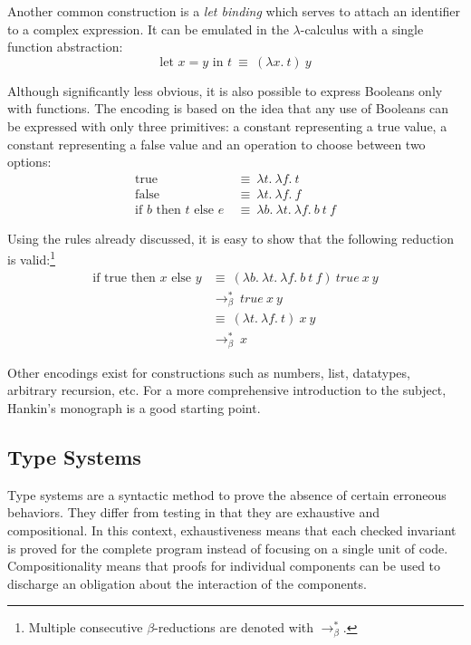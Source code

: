 Another common construction is a \emph{let binding} which serves to attach an identifier to a
complex expression. It can be emulated in the $\lambda$-calculus with a single function abstraction:
\begin{displaymath}
  \text{let } x = y \text{ in } t \: \equiv \: (\lambda x. \ t) \ y
\end{displaymath}

Although significantly less obvious, it is also possible to express Booleans only with functions.
The encoding is based on the idea that any use of Booleans can be expressed with only three
primitives: a constant representing a true value, a constant representing a false value and an
operation to choose between two options:
\begin{align*}
  \text{true}
    & \: \equiv \: \lambda t. \ \lambda f. \ t \\
  \text{false}
    & \: \equiv \: \lambda t. \ \lambda f. \ f \\
  \text{if } b \text{ then } t \text{ else } e
    & \: \equiv \: \lambda b. \ \lambda t. \ \lambda f. \ b \ t \ f
\end{align*}

Using the rules already discussed, it is easy to show that the following reduction is
valid:\footnote{Multiple consecutive $\beta$-reductions are denoted with $\to_\beta^*$.}
\begin{align*}
  \text{if true then } x \text{ else } y
    & \equiv \: (\lambda b. \ \lambda t. \ \lambda f. \ b \ t \ f) \ true \ x \ y \\
    & \to_\beta^* \: true \ x \ y \\
    & \equiv \: (\lambda t. \ \lambda f. \ t) \ x \ y \\
    & \to_\beta^* \: x
\end{align*}

Other encodings exist for constructions such as numbers, list, datatypes, arbitrary recursion, etc.
For a more comprehensive introduction to the subject, Hankin's monograph \cite{hankin-2004-ILCCS} is
a good starting point.

\subsection{Type Systems}

Type systems are a syntactic method to prove the absence of certain erroneous behaviors. They differ
from testing in that they are exhaustive and compositional. In this context, exhaustiveness means
that each checked invariant is proved for the complete program instead of focusing on a single unit
of code. Compositionality means that proofs for individual components can be used to discharge an
obligation about the interaction of the components.

